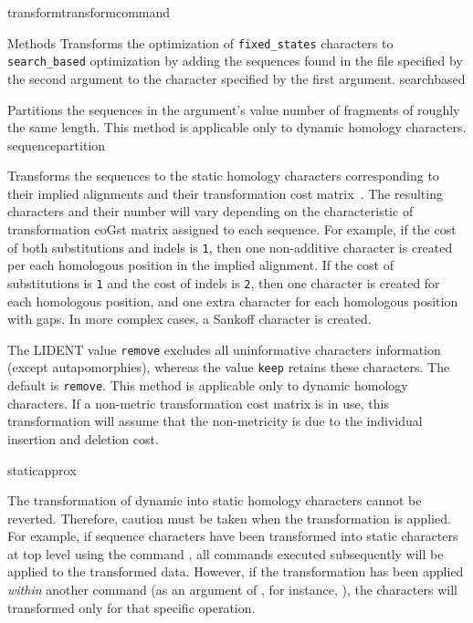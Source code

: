 \begin{command}{transform}{transformcommand}
\begin{arguments}
\begin{argumentgroup}{Methods}
        {Transforms the optimization of \texttt{fixed\_states} characters to \texttt{search\_based}
        optimization \cite{wheeler2003b} by adding the sequences found in the file specified by the second 
        argument to the character specified by the first argument.}
        {searchbased}
        
            {Partitions the sequences in the argument's value number of
            fragments of roughly the same length. This method is applicable only to dynamic homology characters.}
            {sequencepartition}

            {Transforms the sequences to the static homology characters
            corresponding to their implied alignments and their transformation
            cost matrix~\cite{wheeler2003}. The resulting characters and their number will vary
            depending on the characteristic of transformation coGst matrix
            assigned to each sequence. For example, if the cost of both substitutions
            and indels is \texttt{1}, then one non-additive character is created per
            each homologous position in the implied alignment. If the cost of
            substitutions is \texttt{1} and the cost of indels  is \texttt{2}, then
            one character is created for each homologous position, and one extra character for
            each homologous position with gaps. In more complex cases, a Sankoff character is
            created.
            
            The LIDENT value \texttt{remove} excludes all uninformative characters
            information (except autapomorphies), whereas the value \texttt{keep}
            retains these characters. The default is \texttt{remove}. This
            method is applicable only to dynamic homology characters. If
            a non-metric transformation cost matrix is in use, this
            transformation will assume that the non-metricity is due to the
            individual insertion and deletion cost.}
            {staticapprox}
            
            \begin{statement}
  	  The transformation of dynamic into static homology characters cannot be reverted.
	  Therefore, caution must be taken when the transformation is applied. For example,
	  if sequence characters have been transformed into static characters at top level using
	  the command , all commands executed 
	  subsequently will be applied to the transformed data. However, if the transformation has 
	  been applied \emph{within} another command (as an argument of , 
	  for instance, ), the characters will transformed only for that specific operation.
	   \end{statement}
	

\end{argumentgroup}
\end{arguments}
\end{command}
